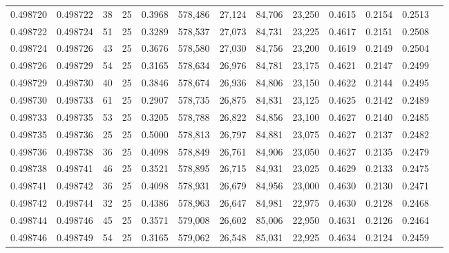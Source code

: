 \begin{tabular}{rrrrrrrrrrrrr}
0.498720 & 0.498722 &    38 &  25 &                                     0.3968 & 578,486 &  27,124 &  84,706 &  23,250 & 0.4615 & 0.2154 & 0.2513 \\
0.498722 & 0.498724 &    51 &  25 &                                     0.3289 & 578,537 &  27,073 &  84,731 &  23,225 & 0.4617 & 0.2151 & 0.2508 \\
0.498724 & 0.498726 &    43 &  25 &                                     0.3676 & 578,580 &  27,030 &  84,756 &  23,200 & 0.4619 & 0.2149 & 0.2504 \\
0.498726 & 0.498729 &    54 &  25 &                                     0.3165 & 578,634 &  26,976 &  84,781 &  23,175 & 0.4621 & 0.2147 & 0.2499 \\
0.498729 & 0.498730 &    40 &  25 &                                     0.3846 & 578,674 &  26,936 &  84,806 &  23,150 & 0.4622 & 0.2144 & 0.2495 \\
0.498730 & 0.498733 &    61 &  25 &                                     0.2907 & 578,735 &  26,875 &  84,831 &  23,125 & 0.4625 & 0.2142 & 0.2489 \\
0.498733 & 0.498735 &    53 &  25 &                                     0.3205 & 578,788 &  26,822 &  84,856 &  23,100 & 0.4627 & 0.2140 & 0.2485 \\
0.498735 & 0.498736 &    25 &  25 &                                     0.5000 & 578,813 &  26,797 &  84,881 &  23,075 & 0.4627 & 0.2137 & 0.2482 \\
0.498736 & 0.498738 &    36 &  25 &                                     0.4098 & 578,849 &  26,761 &  84,906 &  23,050 & 0.4627 & 0.2135 & 0.2479 \\
0.498738 & 0.498741 &    46 &  25 &                                     0.3521 & 578,895 &  26,715 &  84,931 &  23,025 & 0.4629 & 0.2133 & 0.2475 \\
0.498741 & 0.498742 &    36 &  25 &                                     0.4098 & 578,931 &  26,679 &  84,956 &  23,000 & 0.4630 & 0.2130 & 0.2471 \\
0.498742 & 0.498744 &    32 &  25 &                                     0.4386 & 578,963 &  26,647 &  84,981 &  22,975 & 0.4630 & 0.2128 & 0.2468 \\
0.498744 & 0.498746 &    45 &  25 &                                     0.3571 & 579,008 &  26,602 &  85,006 &  22,950 & 0.4631 & 0.2126 & 0.2464 \\
0.498746 & 0.498749 &    54 &  25 &                                     0.3165 & 579,062 &  26,548 &  85,031 &  22,925 & 0.4634 & 0.2124 & 0.2459 \\

\end{tabular}
